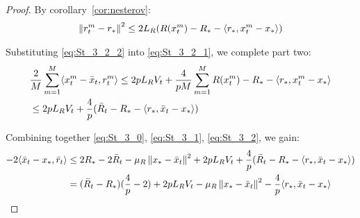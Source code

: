 \begin{proof}
    By corollary~\ref{cor:nesterov}:
    \begin{align}
        \norm{r^m_t-r_*}^2 \leq 2L_R (R(x^m_t) - R_* - \inner {r_*}{x^m_t - x_*}) \label{eq:St_3_2_2}
    \end{align}
    
    Substituting \eqref{eq:St_3_2_2} into \eqref{eq:St_3_2_1}, we complete part two:
    \begin{align}
        &\frac{2}{M} \summ{m=1}{M}{\inner{x^m_t - \bar{x}_t}{r^m_t}}
        \leq 2 p L_R V_t 
        + \frac{4}{pM} \summ{m=1}{M}{R(x^m_t) - R_* - \inner {r_*}{x^m_t - x_*} } \\
        &\leq 2 p L_R V_t 
        + \frac{4}{p} (\bar{R}_t - R_* - \inner {r_*}{\bar{x}_t - x_*}) \label{eq:St_3_2}
    \end{align}
    
    Combining together \eqref{eq:St_3_0}, \eqref{eq:St_3_1}, \eqref{eq:St_3_2}, we gain:
    \begin{align}
         - 2 \inner{\bar{x}_t - x_*}{\bar{r}_t} &\leq
         2 R_* - 2 \bar{R}_t - \mu_R \norm{x_* - \bar{x}_t}^2 
         + 2 p L_R V_t + \frac{4}{p} (\bar{R}_t - R_* - \inner {r_*}{\bar{x}_t - x_*}) \\ 
         &= (\bar{R}_t - R_*)(\frac{4}{p} - 2) + 2 p L_R V_t - \mu_R \norm{x_* - \bar{x}_t}^2 
         - \frac{4}{p}\inner{r_*}{\bar{x}_t - x_*}
         \label{eq:St_3}
    \end{align}
\end{proof}

